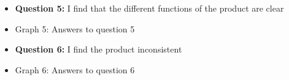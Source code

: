 \documentclass{article}
\begin{document}
\newpage
\begin{itemize}
		\item[] \textbf{Question 5:} I find that the different functions of the product are clear
		\item[] \begin{minipage}[t]{\linewidth}
         	 \raggedright
          	\medskip
          	\centerline{Graph 5: Answers to question 5}
          \end{minipage}
\end{itemize}
\begin{itemize}
		\item[] \textbf{Question 6:} I find the product inconsistent
		\item[] \begin{minipage}[t]{\linewidth}
         	 \raggedright
          	\medskip
          	\centerline{Graph 6: Answers to question 6}
          \end{minipage}
\end{itemize}
\end{document}

